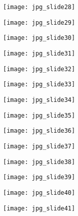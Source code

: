 \documentclass[main.tex]{subfiles}
\begin{document}
\begin{center}
\texttt{[image: jpg\_slide28]}
\end{center}

\begin{center}
\texttt{[image: jpg\_slide29]}
\end{center}

\begin{center}
\texttt{[image: jpg\_slide30]}
\end{center}

\begin{center}
\texttt{[image: jpg\_slide31]}
\end{center}

\begin{center}
\texttt{[image: jpg\_slide32]}
\end{center}

\begin{center}
\texttt{[image: jpg\_slide33]}
\end{center}

\begin{center}
\texttt{[image: jpg\_slide34]}
\end{center}

\begin{center}
\texttt{[image: jpg\_slide35]}
\end{center}

\begin{center}
\texttt{[image: jpg\_slide36]}
\end{center}

\begin{center}
\texttt{[image: jpg\_slide37]}
\end{center}

\begin{center}
\texttt{[image: jpg\_slide38]}
\end{center}

\begin{center}
\texttt{[image: jpg\_slide39]}
\end{center}

\begin{center}
\texttt{[image: jpg\_slide40]}
\end{center}

\begin{center}
\texttt{[image: jpg\_slide41]}
\end{center}
\end{document}
